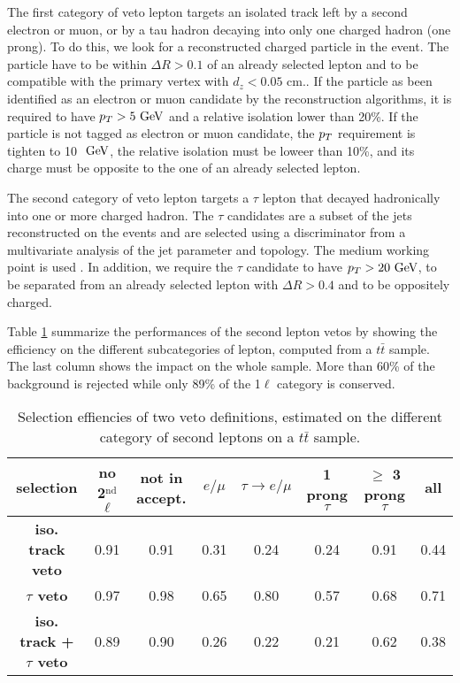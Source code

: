         The first category of veto lepton targets an isolated track left by a second electron or muon, or by a tau hadron
        decaying into only one charged hadron (one prong). To do this, we look for a reconstructed charged particle in the
        event. The particle have to be within $\Delta R > 0.1$ of an already selected lepton and to be compatible with the
        primary vertex with $d_z < 0.05$ cm.. If the particle as been identified as an electron or muon candidate by the 
        reconstruction algorithms, it is required to have $p_T > 5 ~\text{GeV}$ and a relative isolation lower than 20\%. If the
        particle is not tagged as electron or muon candidate, the $p_T$ requirement is tighten to 10 $~\text{GeV}$, the relative
        isolation must be loweer than 10\%, and its charge must be opposite to the one of an already selected lepton.

        The second category of veto lepton targets a $\tau$ lepton that decayed hadronically into one or more charged hadron.
        The $\tau$ candidates are a subset of the jets reconstructed on the events and are selected using a discriminator
        from a multivariate analysis of the jet parameter and topology. The medium working point is used .
        In addition, we require the $\tau$ candidate to have $p_T > 20 ~\text{GeV}$, to be separated from an already selected
        lepton with $\Delta R > 0.4$ and to be oppositely charged. 

        Table \ref{tab:secondLeptonVetoPerformances} summarize the performances of the second lepton vetos by showing the
        efficiency on the different subcategories of lepton, computed from a $t\bar{t}$ sample. The last column shows the
        impact on the whole sample. More than 60\% of the background is rejected while only 89\% of the 1$\ell$ category is
        conserved.

        \begin{table}
        \hspace*{-1.2cm}
        \begin{tabular}{|c|c|cccccc|}
            \hline
            \textbf{selection}                  & no 2$^\text{nd}$ $\ell$ & not in accept. & $e/\mu$ & $\tau \rightarrow e/\mu$ & 1 prong $\tau $&$\geq$ 3 prong $\tau$ & all \\
            \hline
            \textbf{iso. track veto}            & 0.91                    & 0.91  & 0.31  & 0.24  & 0.24  & 0.91  & 0.44  \\  
            \textbf{$\tau$ veto}                & 0.97                    & 0.98  & 0.65  & 0.80  & 0.57  & 0.68  & 0.71  \\
            \hline
            \textbf{iso. track + $\tau$ veto}   & 0.89                    & 0.90  & 0.26  & 0.22  & 0.21  & 0.62  & 0.38 \\
            \hline
        \end{tabular}
            \caption{Selection effiencies of two veto definitions, estimated on the different category of second leptons on a $t\bar{t}$ sample.}
            \label{tab:secondLeptonVetoPerformances}
        \end{table}

